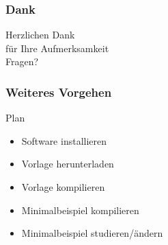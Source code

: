\documentclass{beamer}
\begin{document}
\begin{frame}
	\frametitle{Dank}
	\centering
	\Huge
	Herzlichen Dank\\
	für Ihre Aufmerksamkeit\\[1cm]
	Fragen?
\end{frame}

\begin{frame}
	\frametitle{Weiteres Vorgehen}
	\begin{block}{Plan}
		\begin{itemize}
			\item Software installieren
			\item Vorlage herunterladen
			\item Vorlage kompilieren
			\item Minimalbeispiel kompilieren
			\item Minimalbeispiel studieren/ändern
		\end{itemize}
	\end{block}
\end{frame}
\end{document}
